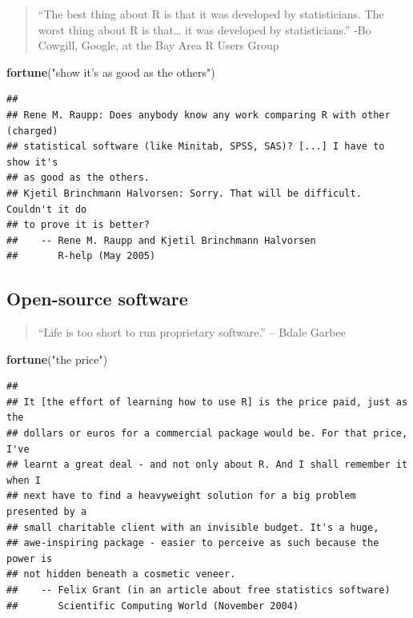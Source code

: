 \documentclass[]{book}
\makeatletter
\newenvironment{Shaded}{\begin{snugshade}}{\end{snugshade}}
\newcommand{\KeywordTok}[1]{\textcolor[rgb]{0.13,0.29,0.53}{\textbf{#1}}}
\newcommand{\StringTok}[1]{\textcolor[rgb]{0.31,0.60,0.02}{#1}}
\newcommand{\NormalTok}[1]{#1}
\newenvironment{kframe}{%
\medskip{}
\setlength{\fboxsep}{.8em}
 \def\at@end@of@kframe{}%
 \ifinner\ifhmode%
  \def\at@end@of@kframe{\end{minipage}}%
  \begin{minipage}{\columnwidth}%
 \fi\fi%
 \def\FrameCommand##1{\hskip\@totalleftmargin \hskip-\fboxsep
 \colorbox{shadecolor}{##1}\hskip-\fboxsep
     \hskip-\linewidth \hskip-\@totalleftmargin \hskip\columnwidth}%
 \MakeFramed {\advance\hsize-\width
   \@totalleftmargin\z@ \linewidth\hsize
   \@setminipage}}%
 {\par\unskip\endMakeFramed%
 \at@end@of@kframe}
\renewenvironment{Shaded}{\begin{kframe}}{\end{kframe}}
\theoremstyle{definition}
\theoremstyle{definition}
\theoremstyle{definition}
\theoremstyle{remark}
\makeatother
\begin{document}
\begin{quote}
``The best thing about R is that it was developed by statisticians. The
worst thing about R is that\ldots{} it was developed by statisticians.''
-Bo Cowgill, Google, at the Bay Area R Users Group
\end{quote}

\begin{Shaded}
\begin{Highlighting}[]
\KeywordTok{fortune}\NormalTok{(}\StringTok{"show it's as good as the others"}\NormalTok{)}
\end{Highlighting}
\end{Shaded}

\begin{verbatim}
## 
## Rene M. Raupp: Does anybody know any work comparing R with other (charged)
## statistical software (like Minitab, SPSS, SAS)? [...] I have to show it's
## as good as the others.
## Kjetil Brinchmann Halvorsen: Sorry. That will be difficult. Couldn't it do
## to prove it is better?
##    -- Rene M. Raupp and Kjetil Brinchmann Halvorsen
##       R-help (May 2005)
\end{verbatim}

\subsection{Open-source software}\label{open-source-software}

\begin{quote}
``Life is too short to run proprietary software.'' -- Bdale Garbee
\end{quote}

\begin{Shaded}
\begin{Highlighting}[]
\KeywordTok{fortune}\NormalTok{(}\StringTok{"the price"}\NormalTok{)}
\end{Highlighting}
\end{Shaded}

\begin{verbatim}
## 
## It [the effort of learning how to use R] is the price paid, just as the
## dollars or euros for a commercial package would be. For that price, I've
## learnt a great deal - and not only about R. And I shall remember it when I
## next have to find a heavyweight solution for a big problem presented by a
## small charitable client with an invisible budget. It's a huge,
## awe-inspiring package - easier to perceive as such because the power is
## not hidden beneath a cosmetic veneer.
##    -- Felix Grant (in an article about free statistics software)
##       Scientific Computing World (November 2004)
\end{verbatim}
\end{document}
